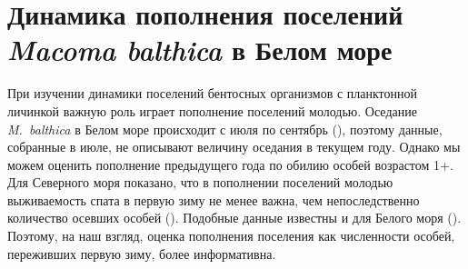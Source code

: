 		\chapter{Динамика пополнения поселений {\it Macoma balthica} в Белом море}
При изучении динамики поселений бентосных организмов с планктонной личинкой важную роль играет пополнение поселений молодью. 
Оседание {\it M.~balthica} в Белом море происходит с июля по сентябрь (\cite{Semenova_1980, Maximovich_1985}), поэтому данные, собранные в июле, не описывают величину оседания в текущем году. 
Однако мы можем оценить пополнение предыдущего года по обилию особей возрастом 1+. 
Для Северного моря показано, что в пополнении поселений молодью выживаемость спата в первую зиму не менее важна, чем непоследственно количество осевших особей (\cite{Beukema_et_al_1998, Strasser_Gunter_2001}). Подобные данные известны и для Белого моря (\cite{Maximovich_Gerasimova_2004}). Поэтому, на наш взгляд, оценка пополнения поселения как численности особей, переживших первую зиму, более информативна.







\par\bigskip

